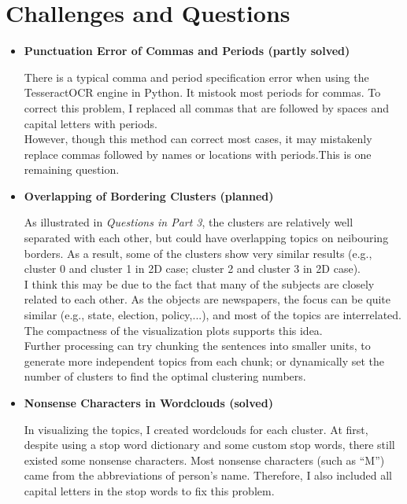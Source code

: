 \documentclass{article}
\begin{document}
\section{Challenges and Questions}
\begin{itemize}
\item \textbf{ Punctuation Error of Commas and Periods (partly solved)}

There is a typical comma and period specification error when using the TesseractOCR engine in Python. It mistook most periods for commas. To correct this problem, I replaced all commas that are followed by spaces and capital letters with periods.\\
[0.5em]
However, though this method can correct most cases, it may mistakenly replace commas followed by names or locations with periods.This is one remaining question.
\item \textbf{ Overlapping of Bordering Clusters (planned)}

As illustrated in \textit{Questions in Part 3}, the clusters are relatively well separated with each other, but could have overlapping topics on neibouring borders. As a result, some of the clusters show very similar results (e.g., cluster 0 and cluster 1 in 2D case; cluster 2 and cluster 3 in 2D case).\\
[0.5em]
I think this may be due to the fact that many of the subjects are closely related to each other. As the objects are newspapers, the focus can be quite similar (e.g., state, election, policy,...), and most of the topics are interrelated. The compactness of the visualization plots supports this idea. \\
[0.5em]
Further processing can try chunking the sentences into smaller units, to generate more independent topics from each chunk; or dynamically set the number of clusters to find the optimal clustering numbers.
\item \textbf{ Nonsense Characters in Wordclouds (solved)}

In visualizing the topics, I created wordclouds for each cluster. At first, despite using a stop word dictionary and some custom stop words, there still existed some nonsense characters. Most nonsense characters (such as “M”) came from the abbreviations of person's name. Therefore, I also included all capital letters in the stop words to fix this problem.

\end{itemize}
\end{document}
